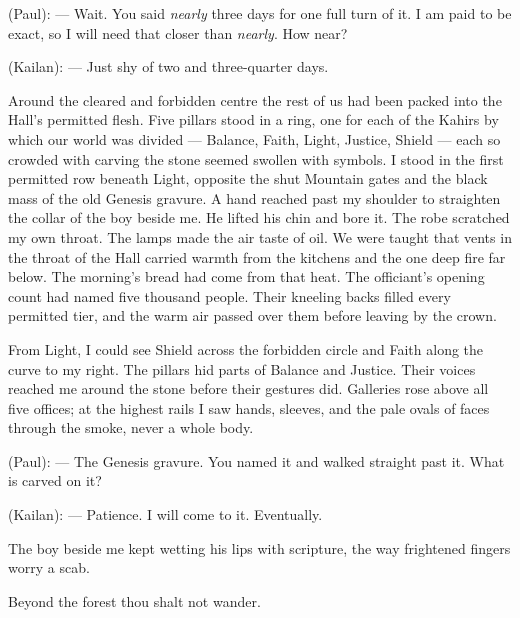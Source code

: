 \begin{room}

(Paul): --- Wait. You said \emph{nearly} three days for one full turn of it. I am paid to be exact, so I will need that closer than \emph{nearly}. How near?

(Kailan): --- Just shy of two and three-quarter days.

\end{room}

Around the cleared and forbidden centre the rest of us had been packed into the Hall's permitted flesh. Five pillars stood in a ring, one for each of the Kahirs by which our world was divided --- Balance, Faith, Light, Justice, Shield --- each so crowded with carving the stone seemed swollen with symbols. I stood in the first permitted row beneath Light, opposite the shut Mountain gates and the black mass of the old Genesis gravure. A hand reached past my shoulder to straighten the collar of the boy beside me. He lifted his chin and bore it. The robe scratched my own throat. The lamps made the air taste of oil. We were taught that vents in the throat of the Hall carried warmth from the kitchens and the one deep fire far below. The morning's bread had come from that heat. The officiant's opening count had named five thousand people. Their kneeling backs filled every permitted tier, and the warm air passed over them before leaving by the crown.\par

From Light, I could see Shield across the forbidden circle and Faith along the curve to my right. The pillars hid parts of Balance and Justice. Their voices reached me around the stone before their gestures did. Galleries rose above all five offices; at the highest rails I saw hands, sleeves, and the pale ovals of faces through the smoke, never a whole body. \par

\begin{room}

(Paul): --- The Genesis gravure. You named it and walked straight past it. What is carved on it?

(Kailan): --- Patience. I will come to it. Eventually.

\end{room}

The boy beside me kept wetting his lips with scripture, the way frightened fingers worry a scab.\par

\begin{scripture}
Beyond the forest thou shalt not wander.
\end{scripture}

